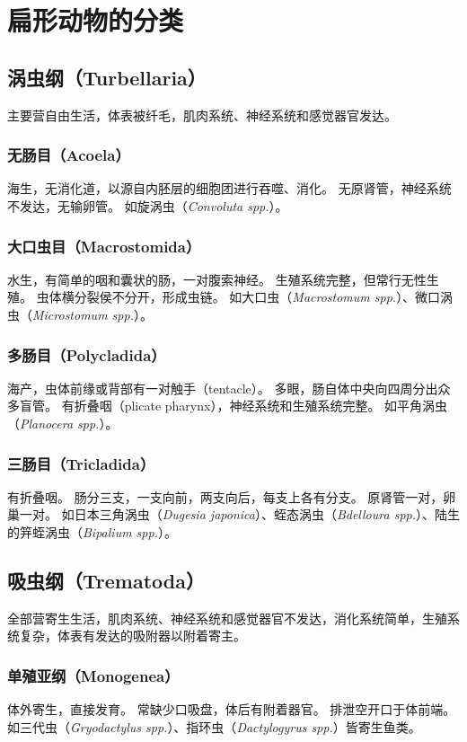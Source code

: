 \documentclass[11pt]{article}
\begin{document}
\section{扁形动物的分类}
\subsection{涡虫纲（Turbellaria）}
主要营自由生活，体表被纤毛，肌肉系统、神经系统和感觉器官发达。

\subsubsection{无肠目（Acoela）}
海生，无消化道，以源自内胚层的细胞团进行吞噬、消化。
无原肾管，神经系统不发达，无输卵管。
如旋涡虫（\textit{Convoluta spp.}）。

\subsubsection{大口虫目（Macrostomida）}
水生，有简单的咽和囊状的肠，一对腹索神经。
生殖系统完整，但常行无性生殖。
虫体横分裂侯不分开，形成虫链。
如大口虫（\textit{Macrostomum spp.}）、微口涡虫（\textit{Microstomum spp.}）。

\subsubsection{多肠目（Polycladida）}
海产，虫体前缘或背部有一对触手（tentacle）。
多眼，肠自体中央向四周分出众多盲管。
有折叠咽（plicate pharynx），神经系统和生殖系统完整。
如平角涡虫（\textit{Planocera spp.}）。

\subsubsection{三肠目（Tricladida）}
有折叠咽。
肠分三支，一支向前，两支向后，每支上各有分支。
原肾管一对，卵巢一对。
如日本三角涡虫（\textit{Dugesia japonica}）、蛭态涡虫（\textit{Bdelloura spp.}）、陆生的笄蛭涡虫（\textit{Bipalium spp.}）。

\subsection{吸虫纲（Trematoda）}
全部营寄生生活，肌肉系统、神经系统和感觉器官不发达，消化系统简单，生殖系统复杂，体表有发达的吸附器以附着寄主。

\subsubsection{单殖亚纲（Monogenea）}
体外寄生，直接发育。
常缺少口吸盘，体后有附着器官。
排泄空开口于体前端。
如三代虫（\textit{Gryodactylus spp.}）、指环虫（\textit{Dactylogyrus spp.}）皆寄生鱼类。
\end{document}
